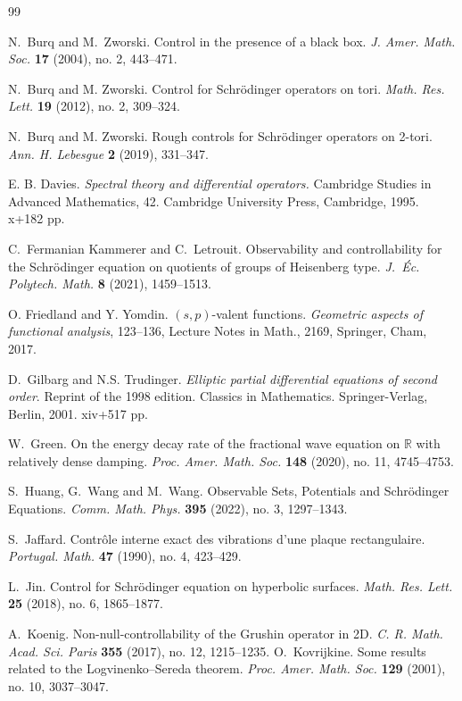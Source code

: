 \documentclass[a4paper,reqno]{amsart}
\theoremstyle{definition}
\numberwithin{equation}{section}
\newcommand{\R}{\mathbb{R}}
\def \R {{\mathbb{R} }}
\begin{document}
\begin{thebibliography}{99}
		
		N.~Burq and M.~Zworski.
  Control in the presence of a black box.
  {\emph{J. Amer. Math. Soc.}} \textbf{17} (2004), no. 2, 443–471.		
		
		N.~Burq and M. Zworski.
		 Control for Schrödinger operators on tori. 
   \emph{Math. Res. Lett.} {\textbf{19}} (2012), no. 2, 309–324.
   
	N.~Burq and M. Zworski.
	Rough controls for Schr\"odinger operators on 2-tori.
        {\emph{Ann. H. Lebesgue}} {\textbf{2}} (2019), 331–347.
  

E. B. Davies. 
\emph{Spectral theory and differential operators.}
Cambridge Studies in Advanced Mathematics, 42. Cambridge University Press, Cambridge, 1995. x+182 pp.
		

	C.~Fermanian Kammerer and C.~Letrouit.
	Observability and controllability for the Schr\"odinger equation on quotients of groups of Heisenberg type.
{\emph{J.~\'Ec. Polytech. Math.}} {\textbf{8}} (2021), 1459--1513.

 O. Friedland and Y. Yomdin.
 $(s,p)$-valent functions. 
 \emph{Geometric aspects of functional analysis}, 123–136, Lecture Notes in Math., 2169, Springer, Cham, 2017.	

 D.~Gilbarg and N.S. Trudinger.
 \emph{Elliptic partial differential equations of second order}. 
 Reprint of the 1998 edition. Classics in Mathematics. Springer-Verlag, Berlin, 2001. xiv+517 pp. 
	
	W.~Green.
	On the energy decay rate of the fractional wave equation on $\R$ with relatively dense damping.
\emph{Proc. Amer. Math. Soc.} \textbf{148} (2020), no. 11, 4745–4753.	
	
	
	S.~Huang, G.~Wang and M.~Wang.
 Observable Sets, Potentials and Schr\"odinger Equations. 
 \emph{Comm. Math. Phys.} \textbf{395} (2022), no. 3, 1297–1343.
 
	S.~Jaffard.
 Contr\^ole interne exact des vibrations d’une plaque rectangulaire.
 {\emph{Portugal. Math.}} {\textbf{47}} (1990), no. 4, 423–429.
 
	L.~Jin. 
 Control for Schr\"odinger equation on hyperbolic surfaces.
{\emph{Math. Res. Lett.}} {\textbf{25}} (2018), no. 6, 1865–1877.	

	A.~Koenig.
 Non-null-controllability of the Grushin operator in 2D.
 {\emph{C. R. Math. Acad. Sci. Paris}} \textbf{355} (2017), no. 12, 1215–1235.	
	O.~Kovrijkine.
 Some results related to the Logvinenko–Sereda theorem. 
 \emph{Proc. Amer. Math. Soc.} \textbf{129} (2001), no. 10, 3037–3047.	
	

\end{thebibliography}
\end{document}
